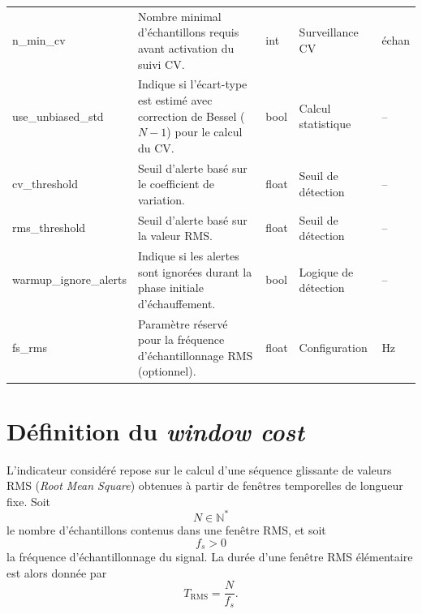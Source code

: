 \documentclass[12pt,a4paper, openany]{book}
\begin{document}
\begin{longtable}{
        >{\ttfamily\small}p{3.7cm} 
        p{7.3cm} 
        >{\centering\arraybackslash}p{1.5cm} 
        >{\centering\arraybackslash}p{2.5cm} 
        >{\centering\arraybackslash}p{1.0cm}}
n\_min\_cv
& Nombre minimal d'échantillons requis avant activation du suivi CV.
& int & Surveillance CV & échan \\

use\_unbiased\_std
& Indique si l'écart-type est estimé avec correction de Bessel (\(N-1\)) pour le calcul du CV.
& bool & Calcul statistique & -- \\

cv\_threshold
& Seuil d'alerte basé sur le coefficient de variation.
& float & Seuil de détection & -- \\

rms\_threshold
& Seuil d'alerte basé sur la valeur RMS.
& float & Seuil de détection & -- \\

warmup\_ignore\_alerts
& Indique si les alertes sont ignorées durant la phase initiale d'échauffement.
& bool & Logique de détection & -- \\

fs\_rms
& Paramètre réservé pour la fréquence d'échantillonnage RMS (optionnel).
& float & Configuration & Hz \\

\end{longtable}




\section{Définition du \textit{window cost}}

L'indicateur considéré repose sur le calcul d'une séquence glissante de valeurs RMS (\textit{Root Mean Square}) obtenues à partir de fenêtres temporelles de longueur fixe. Soit
\begin{equation}
N \in \mathbb{N}^{*}
\end{equation}
le nombre d'échantillons contenus dans une fenêtre RMS, et soit
\begin{equation}
f_s > 0
\end{equation}
la fréquence d'échantillonnage du signal. La durée d'une fenêtre RMS élémentaire est alors donnée par
\begin{equation}
T_{\mathrm{RMS}} = \frac{N}{f_s}.
\label{eq:t_rms}
\end{equation}
\end{document}
